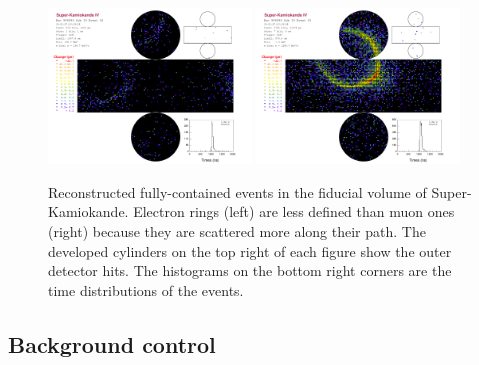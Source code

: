 \begin{figure}
	\centering
	\includegraphics[width=0.48\textwidth]{pics/Electron.pdf}
	\hfill
	\includegraphics[width=0.48\textwidth]{pics/Muon.pdf}
	\caption[Reconstructed fully-contained events in Super-Kamiokande]%
	{Reconstructed fully-contained events in the fiducial volume of Super-Kamiokande.
	Electron rings (left) are less defined than muon ones (right) because they are scattered more %
	along their path.
	The developed cylinders on the top right of each figure show the outer detector hits.
	The histograms on the bottom right corners are the time distributions of the events.}
	\label{fig:sk_events}
\end{figure}


\subsection{Background control}
\label{sec:sk_neutron}

